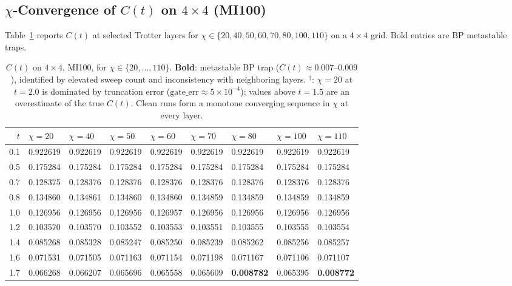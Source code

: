 \documentclass[11pt]{article}
\newcommand{\Ct}{C(t)}
\begin{document}
\subsection{$\chi$-Convergence of $C(t)$ on $4\times4$ (MI100)}
\label{sec:chi_convergence}

Table~\ref{tab:ct} reports $\Ct$ at selected Trotter layers for
$\chi \in \{20, 40, 50, 60, 70, 80, 100, 110\}$ on a $4\times4$ grid.
Bold entries are BP metastable traps.

\begin{table}[ht]
\centering
\caption{%
  $\Ct$ on $4\times4$, MI100, for $\chi \in \{20,\ldots,110\}$.
  \textbf{Bold}: metastable BP trap ($\Ct \approx 0.007$--$0.009$),
  identified by elevated sweep count and inconsistency with neighboring layers.
  $^\dagger$: $\chi=20$ at $t=2.0$ is dominated by truncation error
  ($\text{gate\_err} \approx 5\times10^{-4}$); values above $t=1.5$ are
  an overestimate of the true $\Ct$.
  Clean runs form a monotone converging sequence in $\chi$ at every layer.
}
\label{tab:ct}
\small
\begin{tabular}{r llllllll}
\toprule
$t$ & $\chi=20$ & $\chi=40$ & $\chi=50$ & $\chi=60$ & $\chi=70$ & $\chi=80$ & $\chi=100$ & $\chi=110$ \\
\midrule
0.1 & 0.922619 & 0.922619 & 0.922619 & 0.922619 & 0.922619 & 0.922619 & 0.922619 & 0.922619 \\
0.5 & 0.175284 & 0.175284 & 0.175284 & 0.175284 & 0.175284 & 0.175284 & 0.175284 & 0.175284 \\
0.7 & 0.128375 & 0.128376 & 0.128376 & 0.128376 & 0.128376 & 0.128376 & 0.128376 & 0.128376 \\
0.8 & 0.134860 & 0.134861 & 0.134860 & 0.134860 & 0.134859 & 0.134859 & 0.134859 & 0.134859 \\
1.0 & 0.126956 & 0.126956 & 0.126956 & 0.126957 & 0.126956 & 0.126956 & 0.126956 & 0.126956 \\
1.2 & 0.103570 & 0.103570 & 0.103552 & 0.103553 & 0.103551 & 0.103555 & 0.103555 & 0.103554 \\
1.4 & 0.085268 & 0.085328 & 0.085247 & 0.085250 & 0.085239 & 0.085262 & 0.085256 & 0.085257 \\
1.6 & 0.071531 & 0.071505 & 0.071163 & 0.071154 & 0.071198 & 0.071167 & 0.071106 & 0.071107 \\
1.7 & 0.066268 & 0.066207 & 0.065696 & 0.065558 & 0.065609 & \textbf{0.008782} & 0.065395 & \textbf{0.008772} \\

\end{tabular}
\end{table}
\end{document}
